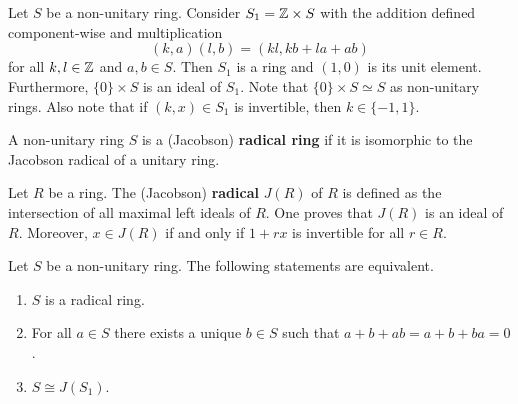 \chapter{}


Let $S$ be a non-unitary ring. Consider $S_1=\mathbb{Z}\times S$ with the addition defined component-wise and  multiplication
\[
(k,a)(l,b)=(kl,kb+la+ab)
\]
for all $k,l\in\mathbb{Z}$ and $a,b\in S$. 
Then $S_1$ is a ring and $(1,0)$ is its unit element. 
Furthermore, $\{0\}\times S$ is an ideal of $S_1$. 
Note that $\{0\}\times S\simeq S$ as non-unitary rings. Also 
note that if $(k,x)\in S_1$ is invertible, 
then $k\in\{-1,1\}$. 

\begin{definition}
    A non-unitary ring $S$ is a (Jacobson) \textbf{radical ring} 
    if it is isomorphic to the Jacobson radical of a unitary ring.
\end{definition}

Let $R$ be a ring. The (Jacobson) \textbf{radical} $J(R)$ of $R$ is defined as the intersection
of all maximal left ideals of $R$. One proves that $J(R)$ is an ideal of $R$. Moreover, 
$x\in J(R)$ if and only if $1+rx$ is invertible for all $r\in R$.

\begin{proposition}
\label{pro:radical}
	Let $S$ be a non-unitary ring. The following statements are equivalent.
	\begin{enumerate}
		\item $S$ is a radical ring.
		\item For all $a\in S$ there exists a unique $b\in S$ such that $a+b+ab=a+b+ba=0$.
		\item $S\cong J(S_1)$. 
	\end{enumerate}
\end{proposition}  
	
